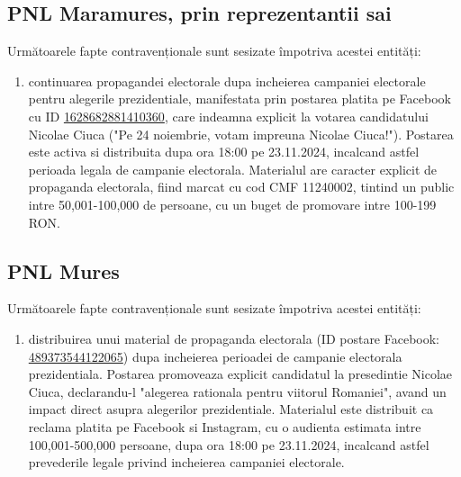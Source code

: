 \documentclass[a4paper,12pt]{article}
\begin{document}
\subsection{PNL Maramures, prin reprezentantii sai}
Următoarele fapte contravenționale sunt sesizate împotriva acestei entități:

\begin{enumerate}[leftmargin=*, label=\arabic*.)]
    \item continuarea propagandei electorale dupa incheierea campaniei electorale pentru alegerile prezidentiale, manifestata prin postarea platita pe Facebook cu ID \href{https://www.facebook.com/ads/library/?id=1628682881410360}{1628682881410360}, care indeamna explicit la votarea candidatului Nicolae Ciuca ("Pe 24 noiembrie, votam impreuna Nicolae Ciuca!"). Postarea este activa si distribuita dupa ora 18:00 pe 23.11.2024, incalcand astfel perioada legala de campanie electorala. Materialul are caracter explicit de propaganda electorala, fiind marcat cu cod CMF 11240002, tintind un public intre 50,001-100,000 de persoane, cu un buget de promovare intre 100-199 RON.
\end{enumerate}

\vspace{0.5cm}

\subsection{PNL Mures}
Următoarele fapte contravenționale sunt sesizate împotriva acestei entități:

\begin{enumerate}[leftmargin=*, label=\arabic*.)]
    \item distribuirea unui material de propaganda electorala (ID postare Facebook: \href{https://www.facebook.com/ads/library/?id=489373544122065}{489373544122065}) dupa incheierea perioadei de campanie electorala prezidentiala. Postarea promoveaza explicit candidatul la presedintie Nicolae Ciuca, declarandu-l "alegerea rationala pentru viitorul Romaniei", avand un impact direct asupra alegerilor prezidentiale. Materialul este distribuit ca reclama platita pe Facebook si Instagram, cu o audienta estimata intre 100,001-500,000 persoane, dupa ora 18:00 pe 23.11.2024, incalcand astfel prevederile legale privind incheierea campaniei electorale.
\end{enumerate}

\vspace{0.5cm}
\end{document}
